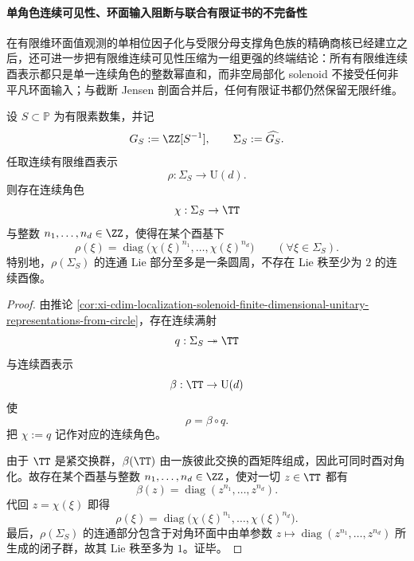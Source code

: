 \paragraph{单角色连续可见性、环面输入阻断与联合有限证书的不完备性}
在有限维环面值观测的单相位因子化与受限分母支撑角色族的精确商核已经建立之后，还可进一步把有限维连续可见性压缩为一组更强的终端结论：所有有限维连续酉表示都只是单一连续角色的整数幂直和，而非空局部化 solenoid 不接受任何非平凡环面输入；与截断 Jensen 剖面合并后，任何有限证书都仍然保留无限纤维。

\begin{theorem}[有限维连续酉表示的单角色整幂正规形]\label{thm:xi-cdim-localization-solenoid-finite-dimensional-unitary-single-character-normal-form}
设 \(S\subset\mathbb P\) 为有限素数集，并记
\[
G_S:=\ZZ[S^{-1}],
\qquad
\Sigma_S:=\widehat{G_S}.
\]
任取连续有限维酉表示
\[
\rho:\Sigma_S\longrightarrow \mathrm{U}(d).
\]
则存在连续角色
\[
\chi:\Sigma_S\to \TT
\]
与整数 \(n_1,\dots,n_d\in \ZZ\)，使得在某个酉基下
\[
\boxed{\;
\rho(\xi)
=
\operatorname{diag}\bigl(\chi(\xi)^{n_1},\dots,\chi(\xi)^{n_d}\bigr)
\qquad(\forall \xi\in \Sigma_S).\;}
\]
特别地，\(\rho(\Sigma_S)\) 的连通 Lie 部分至多是一条圆周，不存在 Lie 秩至少为 \(2\) 的连续酉像。
\end{theorem}
\begin{proof}
由推论 \ref{cor:xi-cdim-localization-solenoid-finite-dimensional-unitary-representations-from-circle}，存在连续满射
\[
q:\Sigma_S\twoheadrightarrow \TT
\]
与连续酉表示
\[
\beta:\TT\to \mathrm{U}(d)
\]
使
\[
\rho=\beta\circ q.
\]
把 \(\chi:=q\) 记作对应的连续角色。

由于 \(\TT\) 是紧交换群，\(\beta(\TT)\) 由一族彼此交换的酉矩阵组成，因此可同时酉对角化。故存在某个酉基与整数 \(n_1,\dots,n_d\in\ZZ\)，使对一切 \(z\in\TT\) 都有
\[
\beta(z)=\operatorname{diag}(z^{n_1},\dots,z^{n_d}).
\]
代回 \(z=\chi(\xi)\) 即得
\[
\rho(\xi)
=
\operatorname{diag}\bigl(\chi(\xi)^{n_1},\dots,\chi(\xi)^{n_d}\bigr).
\]
最后，\(\rho(\Sigma_S)\) 的连通部分包含于对角环面中由单参数 \(z\mapsto \operatorname{diag}(z^{n_1},\dots,z^{n_d})\) 所生成的闭子群，故其 Lie 秩至多为 \(1\)。证毕。
\end{proof}

